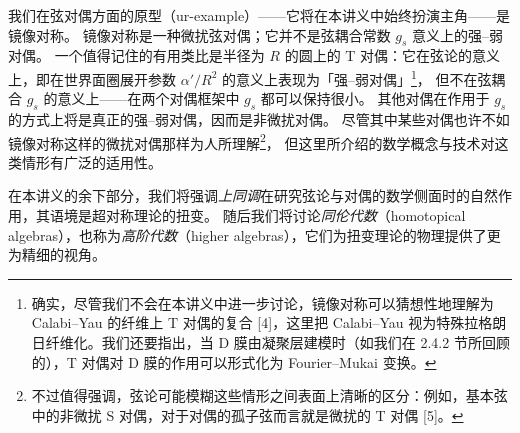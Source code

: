 我们在弦对偶方面的原型（ur-example）——它将在本讲义中始终扮演主角——是镜像对称。
镜像对称是一种微扰弦对偶；它并不是弦耦合常数 $g_s$ 意义上的强–弱对偶。
一个值得记住的有用类比是半径为 $R$ 的圆上的 T 对偶：它在弦论的意义上，即在世界面圈展开参数 $\alpha'/R^2$ 的意义上表现为「强–弱对偶」\footnote{确实，尽管我们不会在本讲义中进一步讨论，镜像对称可以猜想性地理解为 Calabi--Yau 的纤维上 T 对偶的复合 [4]，这里把 Calabi--Yau 视为特殊拉格朗日纤维化。我们还要指出，当 D 膜由凝聚层建模时（如我们在 2.4.2 节所回顾的），T 对偶对 D 膜的作用可以形式化为 Fourier--Mukai 变换。}，
但不在弦耦合 $g_s$ 的意义上——在两个对偶框架中 $g_s$ 都可以保持很小。
其他对偶在作用于 $g_s$ 的方式上将是真正的强–弱对偶，因而是非微扰对偶。
尽管其中某些对偶也许不如镜像对称这样的微扰对偶那样为人所理解\footnote{不过值得强调，弦论可能模糊这些情形之间表面上清晰的区分：例如，基本弦中的非微扰 S 对偶，对于对偶的孤子弦而言就是微扰的 T 对偶 [5]。}，
但这里所介绍的数学概念与技术对这类情形有广泛的适用性。

在本讲义的余下部分，我们将强调\emph{上同调}在研究弦论与对偶的数学侧面时的自然作用，其语境是超对称理论的扭变。
随后我们将讨论\emph{同伦代数}（homotopical algebras），也称为\emph{高阶代数}（higher algebras），它们为扭变理论的物理提供了更为精细的视角。
